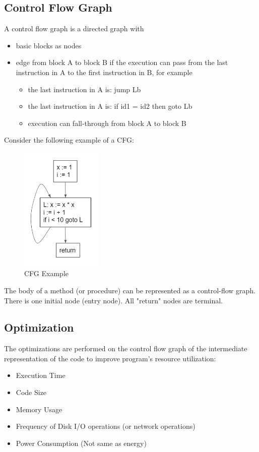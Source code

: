 \subsection{Control Flow Graph}

A control flow graph is a directed graph with
\begin{itemize}
    \item basic blocks as nodes
    \item edge from block A to block B if the execution can pass from the last instruction in A to the first instruction in B, for example
    \begin{itemize}
        \item the last instruction in A is: jump Lb
        \item the last instruction in A is: if id1 = id2 then goto Lb
        \item execution can fall-through from block A to block B
    \end{itemize}
\end{itemize}

Consider the following example of a CFG:

\begin{figure}[htp]
\centering
\includegraphics[height=6cm]{images/CFG Example.png}
\caption{CFG Example}
\end{figure}

The body of a method (or procedure) can be represented as a control-flow graph. There is one initial node (entry node). All "return" nodes are terminal.

\subsection{Optimization}
The optimizations are performed on the control flow graph of the intermediate representation of the code to improve program's resource utilization:

\begin{itemize}
    \item Execution Time
    \item Code Size
    \item Memory Usage
    \item Frequency of Disk I/O operations (or network operations)
    \item Power Consumption (Not same as energy)
\end{itemize}

